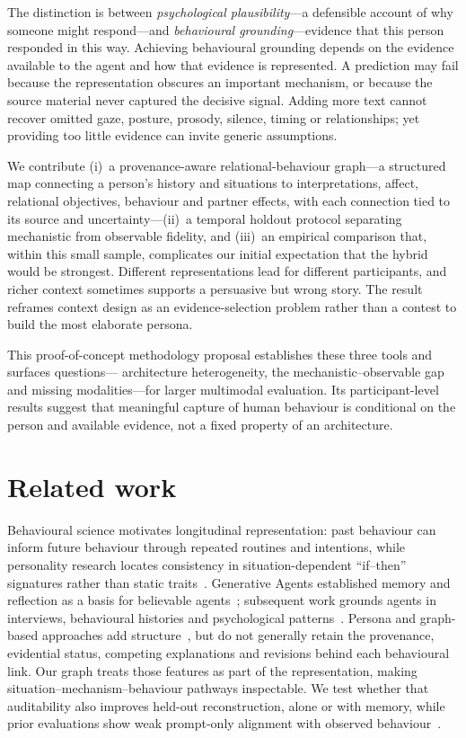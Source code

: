 \documentclass{article}
\begin{document}
The distinction is between \textit{psychological plausibility}---a defensible account of why someone
might respond---and \textit{behavioural grounding}---evidence that this person responded in this way.
Achieving behavioural grounding depends on the evidence available to the agent and how that
evidence is represented. A prediction may fail because the representation obscures an important
mechanism, or because the source material never captured the decisive signal. Adding more text
cannot recover omitted gaze, posture, prosody, silence, timing or relationships; yet providing too
little evidence can invite generic assumptions.

We contribute (i)~a provenance-aware relational-behaviour graph---a structured map connecting a
person's history and situations to interpretations, affect, relational objectives, behaviour and partner
effects, with each connection tied to its source and uncertainty---(ii)~a temporal holdout protocol
separating mechanistic from observable fidelity, and (iii)~an empirical comparison that, within this
small sample, complicates our initial expectation that the hybrid would be strongest. Different
representations lead for different participants, and richer context sometimes supports a persuasive
but wrong story. The result reframes context design as an evidence-selection problem rather than a
contest to build the most elaborate persona.

This proof-of-concept methodology proposal establishes these three tools and surfaces questions---
architecture heterogeneity, the mechanistic--observable gap and missing modalities---for larger
multimodal evaluation. Its participant-level results suggest that meaningful capture of human
behaviour is conditional on the person and available evidence, not a fixed property of an
architecture.

\section{Related work}

Behavioural science motivates longitudinal representation: past behaviour can inform future
behaviour through repeated routines and intentions, while personality research locates consistency
in situation-dependent ``if--then'' signatures rather than static traits~\cite{ouellette1998habit,mischel1995cognitive}.
Generative Agents established memory and reflection as a basis for believable agents~\cite{park2023generative};
subsequent work grounds agents in interviews, behavioural histories and psychological
patterns~\cite{park2024generative,li2025digital,wang2026humanllm}. Persona and graph-based approaches add
structure~\cite{meng2026psyagent,qi2026dynamic,liang2025personaagent}, but do not generally retain the provenance,
evidential status, competing explanations and revisions behind each behavioural link. Our graph
treats those features as part of the representation, making situation--mechanism--behaviour
pathways inspectable. We test whether that auditability also improves held-out reconstruction,
alone or with memory, while prior evaluations show weak prompt-only alignment with observed
behaviour~\cite{hoang2026llms,wang2025llm,lu2025llm}.
\end{document}
